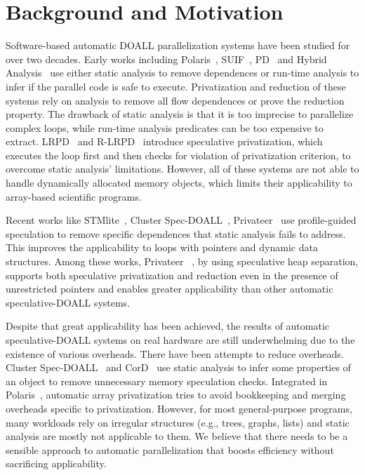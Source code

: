 \section{Background and Motivation}
\label{sec:motivation}


Software-based automatic DOALL parallelization systems have been studied
for over two decades.
%
Early works including Polaris~\cite{blume:94:polaris},
SUIF~\cite{suif:94:stanford}, PD~\cite{rauchwerger:94:ics} and Hybrid
Analysis~\cite{rus:03:hybrid} use either static analysis to remove
dependences or run-time analysis to infer if the parallel code is safe to
execute. Privatization and reduction of these systems rely on
analysis to remove all flow dependences or prove the reduction property.
The drawback of static analysis is that it is too imprecise to parallelize
complex loops, while run-time analysis predicates can be too expensive to
extract. LRPD~\cite{dang:02:ipdps} and R-LRPD~\cite{dang:02:ipdps}
introduce speculative privatization, which executes the loop first and then
checks for violation of privatization criterion, to overcome static
analysis' limitations. However, all of these systems are not able to handle
dynamically allocated memory objects, which limits their applicability to
array-based scientific programs.

Recent works like STMlite~\cite{mehrara:09:stmlite}, Cluster
Spec-DOALL~\cite{kim:12:cgo}, Privateer~\cite{johnson:12:pldi} use
profile-guided speculation to remove specific dependences that static
analysis fails to address. This improves the applicability to loops with
pointers and dynamic data structures.  Among these works, Privateer
~\cite{johnson:12:pldi}, by using speculative heap separation, supports
both speculative privatization and reduction even in the presence of
unrestricted pointers and enables greater applicability than other
automatic speculative-DOALL systems.

Despite that great applicability has been achieved, the results of
automatic speculative-DOALL systems on real hardware are still
underwhelming due to the existence of various overheads. There have been
attempts to reduce overheads. Cluster Spec-DOALL~\cite{kim:12:cgo} and
CorD~\cite{ctian:2008:micro} use static analysis to infer some properties
of an object to remove unnecessary memory speculation checks. Integrated in
Polaris~\cite{blume:94:polaris}, automatic array
privatization\cite{tu:94:lcpc} tries to avoid bookkeeping and merging
overheads specific to privatization. However, for most general-purpose
programs, many workloads rely on irregular structures (e.g., trees, graphs,
lists) and static analysis are mostly not applicable to them. We believe
that there needs to be a sensible approach to automatic parallelization
that boosts efficiency without sacrificing applicability.


